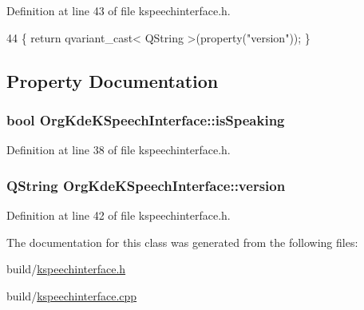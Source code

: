 Definition at line 43 of file kspeechinterface.\+h.


\begin{DoxyCode}
44     \{ \textcolor{keywordflow}{return} qvariant\_cast< QString >(property(\textcolor{stringliteral}{"version"})); \}
\end{DoxyCode}


\subsection{Property Documentation}
\hypertarget{classOrgKdeKSpeechInterface_ab4c84af22a0ab4bb7320e364004634af}{
\subsubsection[{is\+Speaking}]{\setlength{\rightskip}{0pt plus 5cm}bool Org\+Kde\+K\+Speech\+Interface\+::is\+Speaking\hspace{0.3cm}{\ttfamily [read]}}}\label{classOrgKdeKSpeechInterface_ab4c84af22a0ab4bb7320e364004634af}


Definition at line 38 of file kspeechinterface.\+h.

\hypertarget{classOrgKdeKSpeechInterface_a97a98f1003a580e412f8d0ffe427bc3a}{
\subsubsection[{version}]{\setlength{\rightskip}{0pt plus 5cm}Q\+String Org\+Kde\+K\+Speech\+Interface\+::version\hspace{0.3cm}{\ttfamily [read]}}}\label{classOrgKdeKSpeechInterface_a97a98f1003a580e412f8d0ffe427bc3a}


Definition at line 42 of file kspeechinterface.\+h.



The documentation for this class was generated from the following files\+:\begin{DoxyCompactItemize}
\item 
build/\hyperlink{kspeechinterface_8h}{kspeechinterface.\+h}\item 
build/\hyperlink{kspeechinterface_8cpp}{kspeechinterface.\+cpp}\end{DoxyCompactItemize}

